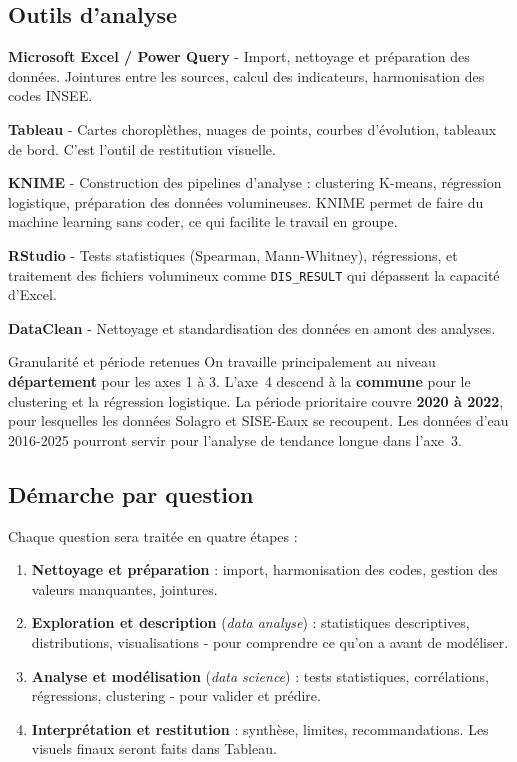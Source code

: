 \documentclass[a4paper,11pt]{article}
\begin{document}
\subsection{Outils d'analyse}

\textbf{Microsoft Excel / Power Query} - Import, nettoyage et préparation des données. Jointures entre les sources, calcul des indicateurs, harmonisation des codes INSEE.

\textbf{Tableau} - Cartes choroplèthes, nuages de points, courbes d'évolution, tableaux de bord. C'est l'outil de restitution visuelle.

\textbf{KNIME} - Construction des pipelines d'analyse : clustering K-means, régression logistique, préparation des données volumineuses. KNIME permet de faire du machine learning sans coder, ce qui facilite le travail en groupe.

\textbf{RStudio} - Tests statistiques (Spearman, Mann-Whitney), régressions, et traitement des fichiers volumineux comme \texttt{DIS\_RESULT} qui dépassent la capacité d'Excel.

\textbf{DataClean} - Nettoyage et standardisation des données en amont des analyses.

\begin{notebox}{Granularité et période retenues}
On travaille principalement au niveau \textbf{département} pour les axes 1 à 3. L'axe~4 descend à la \textbf{commune} pour le clustering et la régression logistique. La période prioritaire couvre \textbf{2020 à 2022}, pour lesquelles les données Solagro et SISE-Eaux se recoupent. Les données d'eau 2016-2025 pourront servir pour l'analyse de tendance longue dans l'axe~3.
\end{notebox}

\subsection{Démarche par question}

Chaque question sera traitée en quatre étapes :

\begin{enumerate}[itemsep=3pt]
  \item \textbf{Nettoyage et préparation} : import, harmonisation des codes, gestion des valeurs manquantes, jointures.
  \item \textbf{Exploration et description} (\textit{data analyse}) : statistiques descriptives, distributions, visualisations - pour comprendre ce qu'on a avant de modéliser.
  \item \textbf{Analyse et modélisation} (\textit{data science}) : tests statistiques, corrélations, régressions, clustering - pour valider et prédire.
  \item \textbf{Interprétation et restitution} : synthèse, limites, recommandations. Les visuels finaux seront faits dans Tableau.
\end{enumerate}
\end{document}
